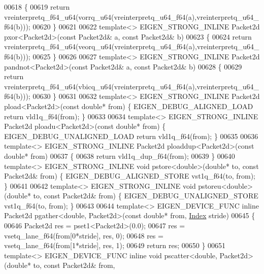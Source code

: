 \begin{DoxyCode}
{{00618 \{
00619   \textcolor{keywordflow}{return} vreinterpretq\_f64\_u64(vorrq\_u64(vreinterpretq\_u64\_f64(a),vreinterpretq\_u64\_f64(b)));
00620 \}
00621 
00622 \textcolor{keyword}{template}<> EIGEN\_STRONG\_INLINE Packet2d pxor<Packet2d>(\textcolor{keyword}{const} Packet2d& a, \textcolor{keyword}{const} Packet2d& b)
00623 \{
00624   \textcolor{keywordflow}{return} vreinterpretq\_f64\_u64(veorq\_u64(vreinterpretq\_u64\_f64(a),vreinterpretq\_u64\_f64(b)));
00625 \}
00626 
00627 \textcolor{keyword}{template}<> EIGEN\_STRONG\_INLINE Packet2d pandnot<Packet2d>(\textcolor{keyword}{const} Packet2d& a, \textcolor{keyword}{const} Packet2d& b)
00628 \{
00629   \textcolor{keywordflow}{return} vreinterpretq\_f64\_u64(vbicq\_u64(vreinterpretq\_u64\_f64(a),vreinterpretq\_u64\_f64(b)));
00630 \}
00631 
00632 \textcolor{keyword}{template}<> EIGEN\_STRONG\_INLINE Packet2d pload<Packet2d>(\textcolor{keyword}{const} \textcolor{keywordtype}{double}* from) \{ EIGEN\_DEBUG\_ALIGNED\_LOAD \textcolor{keywordflow}{
      return} vld1q\_f64(from); \}
00633 
00634 \textcolor{keyword}{template}<> EIGEN\_STRONG\_INLINE Packet2d ploadu<Packet2d>(\textcolor{keyword}{const} \textcolor{keywordtype}{double}* from) \{ EIGEN\_DEBUG\_UNALIGNED\_LOAD \textcolor{keywordflow}{
      return} vld1q\_f64(from); \}
00635 
00636 \textcolor{keyword}{template}<> EIGEN\_STRONG\_INLINE Packet2d ploaddup<Packet2d>(\textcolor{keyword}{const} \textcolor{keywordtype}{double}*   from)
00637 \{
00638   \textcolor{keywordflow}{return} vld1q\_dup\_f64(from);
00639 \}
00640 \textcolor{keyword}{template}<> EIGEN\_STRONG\_INLINE \textcolor{keywordtype}{void} pstore<double>(\textcolor{keywordtype}{double}*   to, \textcolor{keyword}{const} Packet2d& from) \{ 
      EIGEN\_DEBUG\_ALIGNED\_STORE vst1q\_f64(to, from); \}
00641 
00642 \textcolor{keyword}{template}<> EIGEN\_STRONG\_INLINE \textcolor{keywordtype}{void} pstoreu<double>(\textcolor{keywordtype}{double}*  to, \textcolor{keyword}{const} Packet2d& from) \{ 
      EIGEN\_DEBUG\_UNALIGNED\_STORE vst1q\_f64(to, from); \}
00643 
00644 \textcolor{keyword}{template}<> EIGEN\_DEVICE\_FUNC \textcolor{keyword}{inline} Packet2d pgather<double, Packet2d>(\textcolor{keyword}{const} \textcolor{keywordtype}{double}* from, 
      \hyperlink{namespace_eigen_a62e77e0933482dafde8fe197d9a2cfde}{Index} stride)
00645 \{
00646   Packet2d res = pset1<Packet2d>(0.0);
00647   res = vsetq\_lane\_f64(from[0*stride], res, 0);
00648   res = vsetq\_lane\_f64(from[1*stride], res, 1);
00649   \textcolor{keywordflow}{return} res;
00650 \}
00651 \textcolor{keyword}{template}<> EIGEN\_DEVICE\_FUNC \textcolor{keyword}{inline} \textcolor{keywordtype}{void} pscatter<double, Packet2d>(\textcolor{keywordtype}{double}* to, \textcolor{keyword}{const} Packet2d& from, 
}}
\end{DoxyCode}
